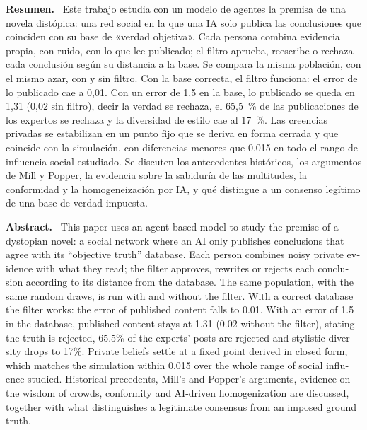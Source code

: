 \documentclass[11pt,a4paper]{article}
\title{\titulo}
\author{Bruno Loiacono\\[2pt]\small Estudiante de Física, Universidad de Buenos Aires}
\date{Noviembre de 2026\\[8pt]\fbox{\small Preprint, documento de trabajo sin revisión por pares}}
\newenvironment{resumen}{\par\noindent\small\textbf{Resumen.}\ }{\par\medskip}
\newenvironment{abstractEN}{\par\noindent\small\begin{otherlanguage}{english}\textbf{Abstract.}\ }{\end{otherlanguage}\par\medskip}
\begin{document}
\maketitle
\thispagestyle{fancy}

\begin{resumen}
Este trabajo estudia con un modelo de agentes la premisa de una novela distópica: una red social en la que una IA solo publica las conclusiones que coinciden con su base de «verdad objetiva». Cada persona combina evidencia propia, con ruido, con lo que lee publicado; el filtro aprueba, reescribe o rechaza cada conclusión según su distancia a la base. Se compara la misma población, con el mismo azar, con y sin filtro. Con la base correcta, el filtro funciona: el error de lo publicado cae a 0,01. Con un error de 1,5 en la base, lo publicado se queda en 1,31 (0,02 sin filtro), decir la verdad se rechaza, el 65,5~\% de las publicaciones de los expertos se rechaza y la diversidad de estilo cae al 17~\%. Las creencias privadas se estabilizan en un punto fijo que se deriva en forma cerrada y que coincide con la simulación, con diferencias menores que 0,015 en todo el rango de influencia social estudiado. Se discuten los antecedentes históricos, los argumentos de Mill y Popper, la evidencia sobre la sabiduría de las multitudes, la conformidad y la homogeneización por IA, y qué distingue a un consenso legítimo de una base de verdad impuesta.
\end{resumen}

\begin{abstractEN}
This paper uses an agent-based model to study the premise of a dystopian novel: a social network where an AI only publishes conclusions that agree with its “objective truth” database. Each person combines noisy private evidence with what they read; the filter approves, rewrites or rejects each conclusion according to its distance from the database. The same population, with the same random draws, is run with and without the filter. With a correct database the filter works: the error of published content falls to 0.01. With an error of 1.5 in the database, published content stays at 1.31 (0.02 without the filter), stating the truth is rejected, 65.5\% of the experts' posts are rejected and stylistic diversity drops to 17\%. Private beliefs settle at a fixed point derived in closed form, which matches the simulation within 0.015 over the whole range of social influence studied. Historical precedents, Mill's and Popper's arguments, evidence on the wisdom of crowds, conformity and AI-driven homogenization are discussed, together with what distinguishes a legitimate consensus from an imposed ground truth.
\end{abstractEN}
\end{document}
